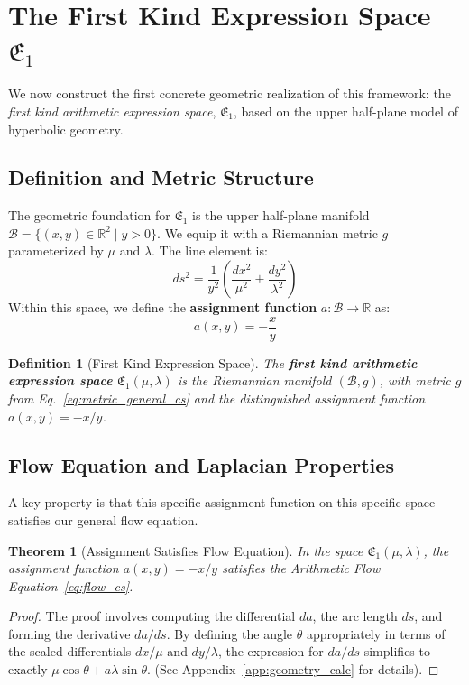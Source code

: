\documentclass[12pt]{article}
\newtheorem{definition}{Definition}[section]
\newtheorem{theorem}{Theorem}[section]
\begin{document}
\section{The First Kind Expression Space \( \mathfrak{E}_1 \)}\label{sec:E1_space_cs}

We now construct the first concrete geometric realization of this framework: the \emph{first kind arithmetic expression space}, \( \mathfrak{E}_1 \), based on the upper half-plane model of hyperbolic geometry.

\subsection{Definition and Metric Structure}

The geometric foundation for \( \mathfrak{E}_1 \) is the upper half-plane manifold \( \mathcal{B} = \{ (x, y) \in \mathbb{R}^2 \mid y > 0 \} \). We equip it with a Riemannian metric \( g \) parameterized by \( \mu \) and \( \lambda \). The line element is:
\begin{equation}
ds^2 = \frac{1}{y^2}\left(\frac{dx^2}{\mu^2} + \frac{dy^2}{\lambda^2}\right) \label{eq:metric_general_cs}
\end{equation}
Within this space, we define the \textbf{assignment function} \( a: \mathcal{B} \to \mathbb{R} \) as:
\begin{equation}\label{eq:genassignment_cs}
a(x, y) = - \frac{x}{y}
\end{equation}

\begin{definition}[First Kind Expression Space]\label{def:E1_space_cs}
The \textbf{first kind arithmetic expression space} \( \mathfrak{E}_1(\mu, \lambda) \) is the Riemannian manifold \( (\mathcal{B}, g) \), with metric \( g \) from Eq.~\eqref{eq:metric_general_cs} and the distinguished assignment function \( a(x,y) = -x/y \).
\end{definition}

\subsection{Flow Equation and Laplacian Properties}

A key property is that this specific assignment function on this specific space satisfies our general flow equation.

\begin{theorem}[Assignment Satisfies Flow Equation]\label{thm:generalE1_cs}
In the space \( \mathfrak{E}_1(\mu, \lambda) \), the assignment function \( a(x,y) = -x/y \) satisfies the Arithmetic Flow Equation~\eqref{eq:flow_cs}.
\end{theorem}
\begin{proof}
The proof involves computing the differential \( da \), the arc length \( ds \), and forming the derivative \( da/ds \). By defining the angle \( \theta \) appropriately in terms of the scaled differentials \( dx/\mu \) and \( dy/\lambda \), the expression for \( da/ds \) simplifies to exactly \( \mu \cos \theta + a \lambda \sin \theta \). (See Appendix~\ref{app:geometry_calc} for details).
\end{proof}
\end{document}
